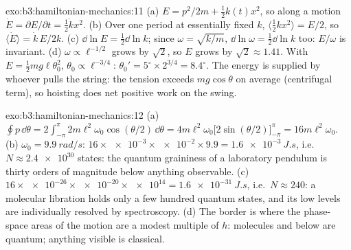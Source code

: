 \begin{solution}{exo:b3:hamiltonian-mechanics:11}
(a) $E = p^2/2m + \tfrac12 k(t)x^2$, so along a motion $\dot E =
\partial E/\partial t = \tfrac12\dot kx^2$. (b) Over one period at
essentially fixed $k$, $\langle\tfrac12 kx^2\rangle = E/2$, so
$\langle\dot E\rangle = \dot k\,E/2k$. (c) $\dd\ln E = \tfrac12\dd\ln
k$; since $\omega = \sqrt{k/m}$, $\dd\ln\omega = \tfrac12\dd\ln k$
too: $E/\omega$ is invariant. (d) $\omega \propto \ell^{-1/2}$ grows
by $\sqrt2$, so $E$ grows by $\sqrt2 \approx 1.41$. With $E = \tfrac12
mg\ell\theta_0^2$, $\theta_0 \propto \ell^{-3/4}$: $\theta_0' =
5^\circ \times 2^{3/4} = 8.4^\circ$. The energy is supplied by whoever
pulls the string: the tension exceeds $mg\cos\theta$ on average
(centrifugal term), so hoisting does net positive work on the swing.
\end{solution}

\begin{solution}{exo:b3:hamiltonian-mechanics:12}
(a) $\oint p\,\dd\theta = 2\int_{-\pi}^{\pi}2m\ell^2\omega_0
\cos(\theta/2)\,\dd\theta = 4m\ell^2\omega_0\big[2\sin(\theta/2)
\big]_{-\pi}^{\pi} = 16m\ell^2\omega_0$. (b) $\omega_0 =
\qty{9.9}{rad/s}$: $16 \times \num{e-3} \times \num{e-2} \times 9.9 =
\qty{1.6e-3}{J.s}$, i.e.\ $N \approx \num{2.4e30}$ states: the quantum
graininess of a laboratory pendulum is thirty orders of magnitude
below anything observable. (c) $16 \times \num{e-26} \times
\num{e-20} \times \num{e14} = \qty{1.6e-31}{J.s}$, i.e.\ $N \approx
240$: a molecular libration holds only a few hundred quantum states,
and its low levels are individually resolved by spectroscopy. (d) The border
is where the phase-space areas of the motion are a modest multiple of
$h$: molecules and below are quantum; anything visible is classical.
\end{solution}

